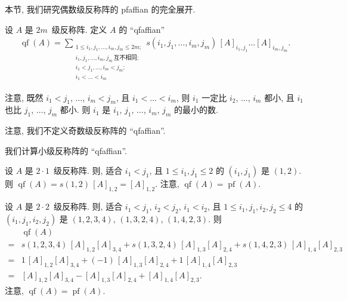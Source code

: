 \documentclass[../libro]{subfiles}
\begin{document}
本节, 我们研究偶数级反称阵的 pfaffian 的完全展开.

\begin{definition}
    设 \(A\) 是 \(2m\)~级反称阵.
    定义 \(A\) 的 ``qfaffian''
    \begin{align*}
        \operatorname{qf} {(A)}
        = \sum_{\substack{
        1 \leq i_1, j_1, \dots, i_m, j_m \leq 2m; \\
        i_1, j_1, \dots, i_m, j_m\,\text{互不相同};   \\
        i_1 < j_1, \dots, i_m < j_m;              \\
                i_1 < \dots < i_m
            }}
        {s(i_1, j_1, \dots, i_m, j_m)\,
            [A]_{i_1,j_1} \dots [A]_{i_m,j_m}}.
    \end{align*}
\end{definition}

注意, 既然 \(i_1 < j_1\), \(\dots\), \(i_m < j_m\),
且 \(i_1 < \dots < i_m\),
则 \(i_1\) 一定比 \(i_2\), \(\dots\), \(i_m\) 都小,
且 \(i_1\) 也比 \(j_1\), \(\dots\), \(j_m\) 都小.
则 \(i_1\) 是 \(i_1\), \(j_1\), \(\dots\), \(i_m\), \(j_m\)
的最小的数.

注意, 我们不定义奇数级反称阵的 ``qfaffian''.

我们计算小级反称阵的 ``qfaffian''.

\begin{example}
    设 \(A\) 是 \(2 \cdot 1\)~级反称阵.
    则, 适合 \(i_1 < j_1\),
    且 \(1 \leq i_1, j_1 \leq 2\) 的 \((i_1, j_1)\) 是 \((1, 2)\).
    则 \(\operatorname{qf} {(A)} = s(1, 2)\, [A]_{1,2} = [A]_{1,2}\).
    注意, \(\operatorname{qf} {(A)} = \operatorname{pf} {(A)}\).
\end{example}

\begin{example}
    设 \(A\) 是 \(2 \cdot 2\)~级反称阵.
    则, 适合 \(i_1 < j_1\), \(i_2 < j_2\),
    \(i_1 < i_2\),
    且 \(1 \leq i_1, j_1, i_2, j_2 \leq 4\)
    的 \((i_1, j_1, i_2, j_2)\) 是
    \((1, 2, 3, 4)\), \((1, 3, 2, 4)\), \((1, 4, 2, 3)\).
    则
    \begin{align*}
             &
        \operatorname{qf} {(A)}
        \\
        = {} &
        s(1, 2, 3, 4)\, [A]_{1,2} [A]_{3,4}
        + s(1, 3, 2, 4)\, [A]_{1,3} [A]_{2,4}
        + s(1, 4, 2, 3)\, [A]_{1,4} [A]_{2,3}
        \\
        = {} &
        1\, [A]_{1,2} [A]_{3,4}
        + (-1)\, [A]_{1,3} [A]_{2,4}
        + 1\, [A]_{1,4} [A]_{2,3}
        \\
        = {} &
        [A]_{1,2} [A]_{3,4}
        - [A]_{1,3} [A]_{2,4}
        + [A]_{1,4} [A]_{2,3}.
    \end{align*}
    注意, \(\operatorname{qf} {(A)} = \operatorname{pf} {(A)}\).
\end{example}
\end{document}
